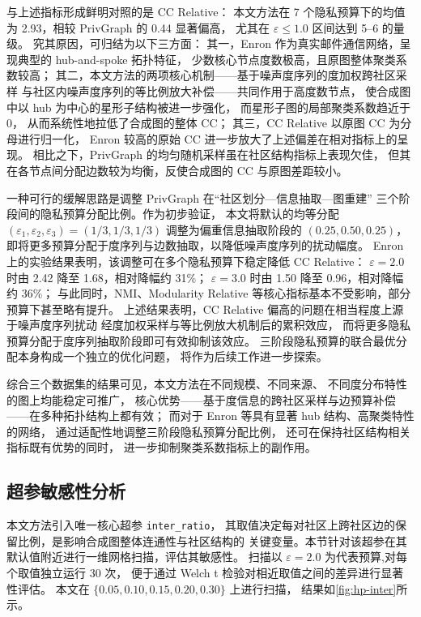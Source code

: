 \par 与上述指标形成鲜明对照的是 CC Relative：
本文方法在 7 个隐私预算下的均值为 2.93，相较 PrivGraph 的 0.44 显著偏高，
尤其在 $\varepsilon \leq 1.0$ 区间达到 5--6 的量级。
究其原因，可归结为以下三方面：
其一，Enron 作为真实邮件通信网络，呈现典型的 hub-and-spoke 拓扑特征，
少数核心节点度数极高，且原图整体聚类系数较高；
其二，本文方法的两项核心机制——基于噪声度序列的度加权跨社区采样
与社区内噪声度序列的等比例放大补偿——共同作用于高度数节点，
使合成图中以 hub 为中心的星形子结构被进一步强化，
而星形子图的局部聚类系数趋近于 0，
从而系统性地拉低了合成图的整体 CC；
其三，CC Relative 以原图 CC 为分母进行归一化，
Enron 较高的原始 CC 进一步放大了上述偏差在相对指标上的呈现。
相比之下，PrivGraph 的均匀随机采样虽在社区结构指标上表现欠佳，
但其在各节点间分配边数较为均衡，反使合成图的 CC 与原图差距较小。

\par 一种可行的缓解思路是调整 PrivGraph 在``社区划分—信息抽取—图重建''
三个阶段间的隐私预算分配比例。作为初步验证，
本文将默认的均等分配 $(\varepsilon_1, \varepsilon_2, \varepsilon_3) = (1/3, 1/3, 1/3)$
调整为偏重信息抽取阶段的 $(0.25, 0.50, 0.25)$，
即将更多预算分配于度序列与边数抽取，以降低噪声度序列的扰动幅度。
Enron 上的实验结果表明，该调整可在多个隐私预算下稳定降低 CC Relative：
$\varepsilon=2.0$ 时由 2.42 降至 1.68，相对降幅约 31\%；
$\varepsilon=3.0$ 时由 1.50 降至 0.96，相对降幅约 36\%；
与此同时，NMI、Modularity Relative 等核心指标基本不受影响，部分预算下甚至略有提升。
上述结果表明，CC Relative 偏高的问题在相当程度上源于噪声度序列扰动
经度加权采样与等比例放大机制后的累积效应，
而将更多隐私预算分配于度序列抽取阶段即可有效抑制该效应。
三阶段隐私预算的联合最优分配本身构成一个独立的优化问题，
将作为后续工作进一步探索。

\par 综合三个数据集的结果可见，本文方法在不同规模、不同来源、
不同度分布特性的图上均能稳定可推广，
核心优势——基于度信息的跨社区采样与边预算补偿——在多种拓扑结构上都有效；
而对于 Enron 等具有显著 hub 结构、高聚类特性的网络，
通过适配性地调整三阶段隐私预算分配比例，
还可在保持社区结构相关指标既有优势的同时，
进一步抑制聚类系数指标上的副作用。





\subsection{超参敏感性分析}
\label{subsec:exp-hyper}


\par 本文方法引入唯一核心超参 \texttt{inter\_ratio}，
其取值决定每对社区上跨社区边的保留比例，是影响合成图整体连通性与社区结构的
关键变量。本节针对该超参在其默认值附近进行一维网格扫描，评估其敏感性。
扫描以 $\varepsilon = 2.0$ 为代表预算,对每个取值独立运行 30 次，
便于通过 Welch t 检验对相近取值之间的差异进行显著性评估。
本文在 $\{0.05, 0.10, 0.15, 0.20, 0.30\}$ 上进行扫描，
结果如\autoref{fig:hp-inter}所示。

